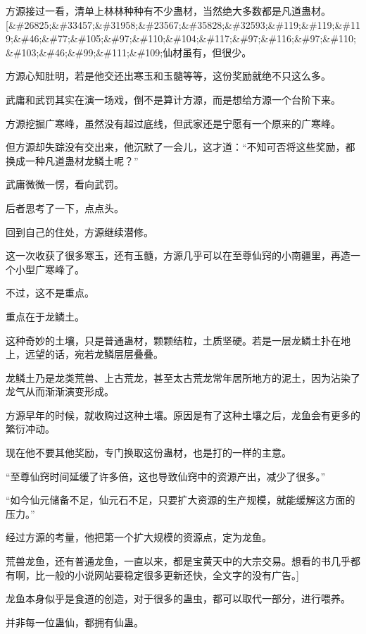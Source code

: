 
\begin{this_body}

方源接过一看，清单上林林种种有不少蛊材，当然绝大多数都是凡道蛊材。[\&\#26825;\&\#33457;\&\#31958;\&\#23567;\&\#35828;\&\#32593;\&\#119;\&\#119;\&\#119;\&\#46;\&\#77;\&\#105;\&\#97;\&\#110;\&\#104;\&\#117;\&\#97;\&\#116;\&\#97;\&\#110;\&\#103;\&\#46;\&\#99;\&\#111;\&\#109;仙材虽有，但很少。

方源心知肚明，若是他交还出寒玉和玉髓等等，这份奖励就绝不只这么多。

武庸和武罚其实在演一场戏，倒不是算计方源，而是想给方源一个台阶下来。

方源挖掘广寒峰，虽然没有超过底线，但武家还是宁愿有一个原来的广寒峰。

但方源却失踪没有交出来，他沉默了一会儿，这才道：“不知可否将这些奖励，都换成一种凡道蛊材龙鳞土呢？”

武庸微微一愣，看向武罚。

后者思考了一下，点点头。

回到自己的住处，方源继续潜修。

这一次收获了很多寒玉，还有玉髓，方源几乎可以在至尊仙窍的小南疆里，再造一个小型广寒峰了。

不过，这不是重点。

重点在于龙鳞土。

这种奇妙的土壤，只是普通蛊材，颗颗结粒，土质坚硬。若是一层龙鳞土扑在地上，远望的话，宛若龙鳞层层叠叠。

龙鳞土乃是龙类荒兽、上古荒龙，甚至太古荒龙常年居所地方的泥土，因为沾染了龙气从而渐渐演变形成。

方源早年的时候，就收购过这种土壤。原因是有了这种土壤之后，龙鱼会有更多的繁衍冲动。

现在他不要其他奖励，专门换取这份蛊材，也是打的一样的主意。

“至尊仙窍时间延缓了许多倍，这也导致仙窍中的资源产出，减少了很多。”

“如今仙元储备不足，仙元石不足，只要扩大资源的生产规模，就能缓解这方面的压力。”

经过方源的考量，他把第一个扩大规模的资源点，定为龙鱼。

荒兽龙鱼，还有普通龙鱼，一直以来，都是宝黄天中的大宗交易。想看的书几乎都有啊，比一般的小说网站要稳定很多更新还快，全文字的没有广告。]

龙鱼本身似乎是食道的创造，对于很多的蛊虫，都可以取代一部分，进行喂养。

并非每一位蛊仙，都拥有仙蛊。


\end{this_body}
